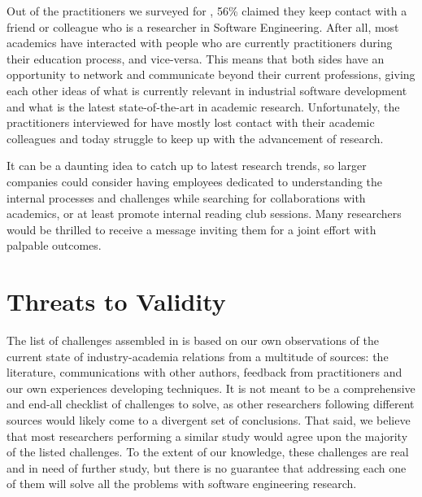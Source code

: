 Out of the practitioners we surveyed for , 56\% claimed they keep contact with a friend or colleague who is a researcher in Software Engineering.
After all, most academics have interacted with people who are currently practitioners during their education process, and vice-versa.
This means that both sides have an opportunity to network and communicate beyond their current professions, giving each other ideas of what is currently relevant in industrial software development and what is the latest state-of-the-art in academic research.
Unfortunately, the practitioners interviewed for  have mostly lost contact with their academic colleagues and today struggle to keep up with the advancement of research.

It can be a daunting idea to catch up to latest research trends, so larger companies could consider having employees dedicated to understanding the internal processes and challenges while searching for collaborations with academics, or at least promote internal reading club sessions.
Many researchers would be thrilled to receive a message inviting them for a joint effort with palpable outcomes.

\section{Threats to Validity}
\label{sec:gap_threats}

The list of challenges assembled in  is based on our own observations of the current state of industry-academia relations from a multitude of sources: the literature, communications with other authors, feedback from practitioners and our own experiences developing techniques.
It is not meant to be a comprehensive and end-all checklist of challenges to solve, as other researchers following different sources would likely come to a divergent set of conclusions.
That said, we believe that most researchers performing a similar study would agree upon the majority of the listed challenges.
To the extent of our knowledge, these challenges are real and in need of further study, but there is no guarantee that addressing each one of them will solve all the problems with software engineering research.